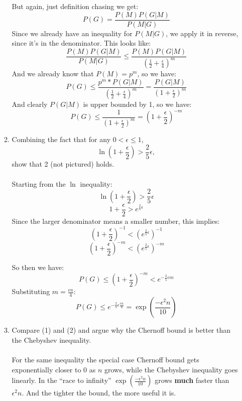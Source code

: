 \begin{enumerate}
\begin{enumerate}
        But again, just definition chasing we get:
        $$P(G) = \frac{P(M)P(G|M)}{P(M|G)}$$
        Since we already have an inequality for $P(M|G)$, we apply it in reverse, since it's in the denominator. This looks like:
        $$\frac{P(M)P(G|M)}{P(M|G)} \leq \frac{P(M)P(G|M)}{(\frac{1}{2} + \frac{\epsilon}{4})^m}$$
        And we already know that $P(M) = p^m$, so we have:
        $$P(G) \leq \frac{p^m * P(G|M)}{(\frac{1}{2} + \frac{\epsilon}{4})^m} = \frac{P(G|M)}{(1 + \frac{\epsilon}{2})^m}$$
        And clearly $P(G|M)$ is upper bounded by 1, so we have:
        $$P(G) \leq \frac{1}{(1 + \frac{\epsilon}{2})^m} = (1 + \frac{\epsilon}{2})^{-m}$$

      \item Combining the fact that for any $0 < \epsilon \leq 1$,
        $$\ln(1 + \frac{\epsilon}{2}) > \frac{2}{5} \epsilon,$$        
        show that 2 (not pictured) holds.\\\\


        Starting from the $\ln$ inequality:
        $$\ln(1 + \frac{\epsilon}{2}) > \frac{2}{5} \epsilon$$
        $$1 + \frac{\epsilon}{2} > e^{\frac{2}{5} \epsilon}$$
        Since the larger denominator means a smaller number, this implies:
        $$(1 + \frac{\epsilon}{2})^{-1} < (e^{\frac{2}{5} \epsilon})^{-1}$$
        $$(1 + \frac{\epsilon}{2})^{-m} < (e^{\frac{2}{5} \epsilon})^{-m}$$

        So then we have:
        $$P(G) \leq (1 + \frac{\epsilon}{2})^{-m} < e^{-\frac{2}{5} \epsilon m}$$
        Substituting $m = \frac{\epsilon n}{4}$:
        $$P(G) \leq e^{-\frac{2}{5} \epsilon \frac{\epsilon n}{4}} = \exp(\frac{- \epsilon^2 n}{10})$$

      \item Compare (1) and (2) and argue why the Chernoff bound is better than the Chebyshev inequality.\\\\

        For the same inequality the special case Chernoff bound gets exponentially closer to 0 as $n$ grows, while the Chebyshev inequality goes linearly. In the ``race to infinity'' $\exp(\frac{- \epsilon^2 n}{10})$ grows \textbf{much} faster than $\epsilon^2 n$. And the tighter the bound, the more useful it is.
        
    \end{enumerate}
\end{enumerate}


